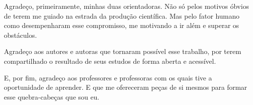 Agradeço, primeiramente, minhas duas orientadoras. Não só pelos motivos óbvios de terem me guiado na estrada da produção científica. Mas pelo fator humano como desempenharam esse compromisso, me motivando a ir além e superar os obstáculos.   

Agradeço aos autores e autoras que tornaram possível esse trabalho, por terem compartilhado o resultado de seus estudos de forma aberta e acessível.

E, por fim, agradeço aos professores e professoras com os quais tive a oportunidade de aprender. E que me ofereceram peças de si mesmos para formar esse quebra-cabeças que sou eu.